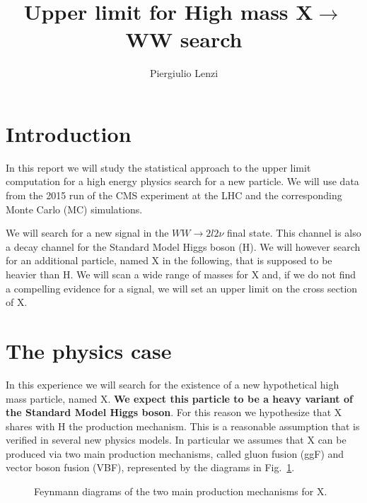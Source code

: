 \documentclass[a4paper,12pt]{article}
\title{Upper limit for High mass X$\rightarrow$WW search}
\author{Piergiulio Lenzi}
\begin{document}
\maketitle

\begin{abstract}
\end{abstract}

\section{Introduction}
In this report we will study the statistical approach to the upper limit computation for a high energy physics search for a new particle.
We will use data from the 2015 run of the CMS experiment at the LHC and the corresponding Monte Carlo (MC) simulations.

We will search for a new signal in the $WW\rightarrow{}2l2\nu$ final state. This channel is also a decay channel for the Standard Model Higgs boson (H). 
We will however search for an additional particle, named X in the following, that is supposed to be heavier than H. 
We will scan a wide range of masses for X and, if we do not find a compelling evidence for a signal, we will set an upper limit on the  cross section of X.

\section{The physics case}
In this experience we will search for the existence of a new hypothetical high mass particle, named X. {\bf We expect this particle to be a heavy variant of the Standard Model Higgs boson}. 
For this reason we hypothesize that X shares with H the production mechanism. This is a reasonable assumption that is verified in several new physics models.
In particular we assumes that X can be produced via two main production mechanisms, called gluon fusion (ggF) and vector boson fusion (VBF), represented by the diagrams in Fig.~\ref{fig:prod}.
\begin{figure}
 \centering
 \caption{Feynmann diagrams of the two main production mechanisms for X.\label{fig:prod}}
\end{figure}
\end{document}

